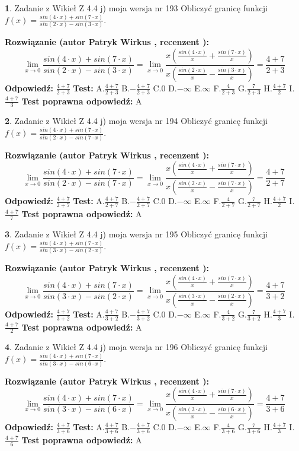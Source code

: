 \documentclass[12pt, a4paper]{article}
\theoremstyle{definition} %
\newtheorem{zad}{}
\newcommand{\zadStart}[1]{\begin{zad}#1\newline}
\newcommand{\zadStop}{\end{zad}}
\newcommand{\rozwStart}[2]{\noindent \textbf{Rozwiązanie (autor #1 , recenzent #2): }\newline}
\newcommand{\rozwStop}{\newline}
\newcommand{\odpStart}{\noindent \textbf{Odpowiedź:}\newline}
\newcommand{\odpStop}{\newline}
\newcommand{\testStart}{\noindent \textbf{Test:}\newline}
\newcommand{\testStop}{\newline}
\newcommand{\kluczStart}{\noindent \textbf{Test poprawna odpowiedź:}\newline}
\newcommand{\kluczStop}{\newline}
\begin{document}
\zadStart{Zadanie z Wikieł Z 4.4 j) moja wersja nr 193}
Obliczyć granicę funkcji $f(x)=\frac{sin(4\cdot x) +sin(7\cdot x)}{sin(2\cdot x) -sin(3\cdot x)}$.
\zadStop
\rozwStart{Patryk Wirkus}{}
$$\lim\limits_{x\to 0}\frac{sin(4\cdot x) +sin(7\cdot x)}{sin(2\cdot x) -sin(3\cdot x)}=\lim\limits_{x\to 0}\frac{x(\frac{sin(4\cdot x)}{x}+\frac{sin(7\cdot x)}{x})}{x(\frac{sin(2\cdot x)}{x}-\frac{sin(3\cdot x)}{x})}=\frac{4+7}{2+3}$$
\rozwStop
\odpStart
$\frac{4+7}{2+3}$
\odpStop
\testStart
A.$\frac{4+7}{2+3}$
B.$-\frac{4+7}{2+3}$
C.$0$
D.$-\infty$
E.$\infty$
F.$\frac{4}{2+3}$
G.$\frac{7}{2+3}$
H.$\frac{4+7}{2}$
I.$\frac{4+7}{3}$
\testStop
\kluczStart
A
\kluczStop



\zadStart{Zadanie z Wikieł Z 4.4 j) moja wersja nr 194}
Obliczyć granicę funkcji $f(x)=\frac{sin(4\cdot x) +sin(7\cdot x)}{sin(2\cdot x) -sin(7\cdot x)}$.
\zadStop
\rozwStart{Patryk Wirkus}{}
$$\lim\limits_{x\to 0}\frac{sin(4\cdot x) +sin(7\cdot x)}{sin(2\cdot x) -sin(7\cdot x)}=\lim\limits_{x\to 0}\frac{x(\frac{sin(4\cdot x)}{x}+\frac{sin(7\cdot x)}{x})}{x(\frac{sin(2\cdot x)}{x}-\frac{sin(7\cdot x)}{x})}=\frac{4+7}{2+7}$$
\rozwStop
\odpStart
$\frac{4+7}{2+7}$
\odpStop
\testStart
A.$\frac{4+7}{2+7}$
B.$-\frac{4+7}{2+7}$
C.$0$
D.$-\infty$
E.$\infty$
F.$\frac{4}{2+7}$
G.$\frac{7}{2+7}$
H.$\frac{4+7}{2}$
I.$\frac{4+7}{7}$
\testStop
\kluczStart
A
\kluczStop



\zadStart{Zadanie z Wikieł Z 4.4 j) moja wersja nr 195}
Obliczyć granicę funkcji $f(x)=\frac{sin(4\cdot x) +sin(7\cdot x)}{sin(3\cdot x) -sin(2\cdot x)}$.
\zadStop
\rozwStart{Patryk Wirkus}{}
$$\lim\limits_{x\to 0}\frac{sin(4\cdot x) +sin(7\cdot x)}{sin(3\cdot x) -sin(2\cdot x)}=\lim\limits_{x\to 0}\frac{x(\frac{sin(4\cdot x)}{x}+\frac{sin(7\cdot x)}{x})}{x(\frac{sin(3\cdot x)}{x}-\frac{sin(2\cdot x)}{x})}=\frac{4+7}{3+2}$$
\rozwStop
\odpStart
$\frac{4+7}{3+2}$
\odpStop
\testStart
A.$\frac{4+7}{3+2}$
B.$-\frac{4+7}{3+2}$
C.$0$
D.$-\infty$
E.$\infty$
F.$\frac{4}{3+2}$
G.$\frac{7}{3+2}$
H.$\frac{4+7}{3}$
I.$\frac{4+7}{2}$
\testStop
\kluczStart
A
\kluczStop



\zadStart{Zadanie z Wikieł Z 4.4 j) moja wersja nr 196}
Obliczyć granicę funkcji $f(x)=\frac{sin(4\cdot x) +sin(7\cdot x)}{sin(3\cdot x) -sin(6\cdot x)}$.
\zadStop
\rozwStart{Patryk Wirkus}{}
$$\lim\limits_{x\to 0}\frac{sin(4\cdot x) +sin(7\cdot x)}{sin(3\cdot x) -sin(6\cdot x)}=\lim\limits_{x\to 0}\frac{x(\frac{sin(4\cdot x)}{x}+\frac{sin(7\cdot x)}{x})}{x(\frac{sin(3\cdot x)}{x}-\frac{sin(6\cdot x)}{x})}=\frac{4+7}{3+6}$$
\rozwStop
\odpStart
$\frac{4+7}{3+6}$
\odpStop
\testStart
A.$\frac{4+7}{3+6}$
B.$-\frac{4+7}{3+6}$
C.$0$
D.$-\infty$
E.$\infty$
F.$\frac{4}{3+6}$
G.$\frac{7}{3+6}$
H.$\frac{4+7}{3}$
I.$\frac{4+7}{6}$
\testStop
\kluczStart
A
\kluczStop
\end{document}
